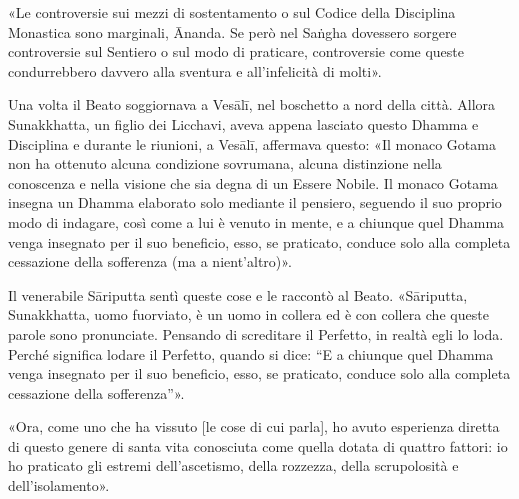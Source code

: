 «Le controversie sui mezzi di sostentamento o sul Codice della Disciplina
Monastica sono marginali, Ānanda. Se però nel Saṅgha dovessero sorgere
controversie sul Sentiero o sul modo di praticare, controversie come queste
condurrebbero davvero alla sventura e all’infelicità di molti».


Una volta il Beato soggiornava a Vesālī, nel boschetto a nord della città.
Allora Sunakkhatta, un figlio dei Licchavi, aveva appena lasciato questo Dhamma
e Disciplina e durante le riunioni, a Vesālī, affermava questo: «Il monaco
Gotama non ha ottenuto alcuna condizione sovrumana, alcuna distinzione nella
conoscenza e nella visione che sia degna di un Essere Nobile. Il monaco Gotama
insegna un Dhamma elaborato solo mediante il pensiero, seguendo il suo proprio
modo di indagare, così come a lui è venuto in mente, e a chiunque quel Dhamma
venga insegnato per il suo beneficio, esso, se praticato, conduce solo alla
completa cessazione della sofferenza (ma a nient’altro)».

Il venerabile Sāriputta sentì queste cose e le raccontò al Beato. «Sāriputta,
Sunakkhatta, uomo fuorviato, è un uomo in collera ed è con collera che queste
parole sono pronunciate. Pensando di screditare il Perfetto, in realtà egli lo
loda. Perché significa lodare il Perfetto, quando si dice: “E a chiunque quel
Dhamma venga insegnato per il suo beneficio, esso, se praticato, conduce solo
alla completa cessazione della sofferenza”».

«Ora, come uno che ha vissuto [le cose di cui parla], ho avuto esperienza
diretta di questo genere di santa vita conosciuta come quella dotata di quattro
fattori: io ho praticato gli estremi dell’ascetismo, della rozzezza, della
scrupolosità e dell’isolamento».

